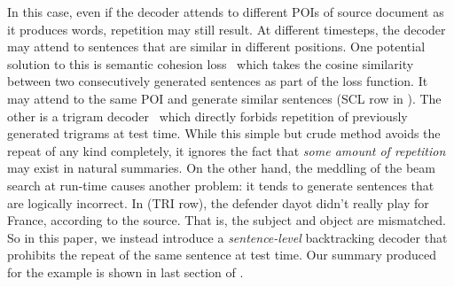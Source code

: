 In this case, even if the decoder attends to different POIs of 
source document as it produces words, repetition may still result.  
At different timesteps,
the decoder may attend 
to sentences that are similar in different positions.
One potential solution to this is semantic cohesion loss~\cite{elikyilmazBHC18}
which takes the cosine similarity between two consecutively generated sentences
as part of the loss function. It may attend to the same POI
and generate similar sentences (SCL row in ).  
The other is a trigram decoder~\cite{PaulusXS17} 
which directly forbids repetition of previously generated trigrams at test time. 
While this simple but crude method avoids the repeat of any kind
completely, 
it ignores the fact that \textit{some amount of repetition} may exist
in natural summaries.  
On the other hand, the meddling of the beam search at run-time causes another problem: 
it tends to generate sentences that are logically incorrect. 
In  (TRI row), the defender dayot didn't
really play for France, according to the source.
That is, the subject and object are mismatched.
So in this paper, we instead introduce a {\em sentence-level} backtracking decoder
that prohibits the repeat of the same sentence at test time.
Our summary produced for the example is shown in last section of 
.

%

